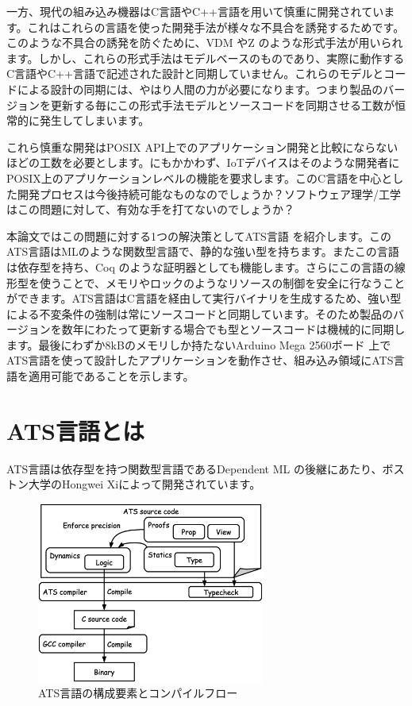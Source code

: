 \documentclass{ipsjprosym}
\begin{document}
一方、現代の組み込み機器はC言語やC++言語を用いて慎重に開発されています。これはこれらの言語を使った開発手法が様々な不具合を誘発するためです。このような不具合の誘発を防ぐために、VDM \cite{vdm} やZ \cite{z_notation} のような形式手法が用いられます。しかし、これらの形式手法はモデルベースのものであり、実際に動作するC言語やC++言語で記述された設計と同期していません。これらのモデルとコードによる設計の同期には、やはり人間の力が必要になります。つまり製品のバージョンを更新する毎にこの形式手法モデルとソースコードを同期させる工数が恒常的に発生してしまいます。

これら慎重な開発はPOSIX API上でのアプリケーション開発と比較にならないほどの工数を必要とします。にもかかわず、IoTデバイスはそのような開発者にPOSIX上のアプリケーションレベルの機能を要求します。このC言語を中心とした開発プロセスは今後持続可能なものなのでしょうか？ソフトウェア理学/工学はこの問題に対して、有効な手を打てないのでしょうか？

本論文ではこの問題に対する1つの解決策としてATS言語 \cite{ats} を紹介します。このATS言語はMLのような関数型言語で、静的な強い型を持ちます。またこの言語は依存型を持ち、Coq \cite{Coq_manual} のような証明器としても機能します。さらにこの言語の線形型を使うことで、メモリやロックのようなリソースの制御を安全に行なうことができます。ATS言語はC言語を経由して実行バイナリを生成するため、強い型による不変条件の強制は常にソースコードと同期しています。そのため製品のバージョンを数年にわたって更新する場合でも型とソースコードは機械的に同期します。最後にわずか8kBのメモリしか持たないArduino Mega 2560ボード \cite{arduino-mega} 上でATS言語を使って設計したアプリケーションを動作させ、組み込み領域にATS言語を適用可能であることを示します。

\section{ATS言語とは}

ATS言語は依存型を持つ関数型言語であるDependent ML \cite{Dependent-ML-Thesis} の後継にあたり、ボストン大学のHongwei Xiによって開発されています。

\begin{figure}[h]
\centering
\includegraphics[width=75mm]{draw/flow.eps}
\caption{ATS言語の構成要素とコンパイルフロー}
\label{fig:flow}
\end{figure}
\end{document}

